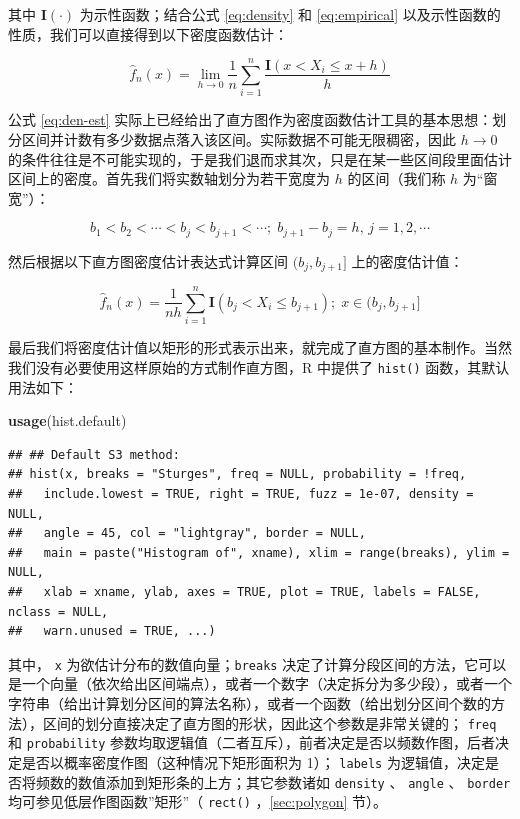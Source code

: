 \documentclass[
  b5paper,
  UTF8,twoside]{book}
\newenvironment{Shaded}{\begin{snugshade}}{\end{snugshade}}
\newcommand{\FunctionTok}[1]{\textcolor[rgb]{0.13,0.29,0.53}{\textbf{#1}}}
\newcommand{\NormalTok}[1]{#1}
\begin{document}
其中 \(\mathbf{I}(\cdot)\) 为示性函数；结合公式 \eqref{eq:density} 和 \eqref{eq:empirical} 以及示性函数的性质，我们可以直接得到以下密度函数估计：

\begin{equation} 
\hat{f}_{n}(x)=\lim_{h\rightarrow0}\frac{1}{n}\sum_{i=1}^{n}\frac{\mathbf{I}(x<X_{i}\leq x+h)}{h}
\label{eq:den-est}
\end{equation}

公式 \eqref{eq:den-est} 实际上已经给出了直方图作为密度函数估计工具的基本思想：划分区间并计数有多少数据点落入该区间。实际数据不可能无限稠密，因此 \(h\rightarrow0\) 的条件往往是不可能实现的，于是我们退而求其次，只是在某一些区间段里面估计区间上的密度。首先我们将实数轴划分为若干宽度为 \(h\) 的区间（我们称 \(h\) 为``窗宽''）：

\begin{equation} 
b_{1}<b_{2}<\cdots<b_{j}<b_{j+1}<\cdots;\;b_{j+1}-b_{j}=h,\,j=1,2,\cdots
\label{eq:den-est2}
\end{equation}

然后根据以下直方图密度估计表达式计算区间 \((b_j,b_{j+1}]\) 上的密度估计值：

\begin{equation} 
\hat{f}_{n}(x)=\frac{1}{nh}\sum_{i=1}^{n}\mathbf{I}(b_{j}<X_{i}\leq b_{j+1});\;x\in(b_{j},b_{j+1}]
\label{eq:den-formula}
\end{equation}

最后我们将密度估计值以矩形的形式表示出来，就完成了直方图的基本制作。当然我们没有必要使用这样原始的方式制作直方图，R 中提供了 \texttt{hist()} 函数，其默认用法如下：

\begin{Shaded}
\begin{Highlighting}[]
\FunctionTok{usage}\NormalTok{(hist.default)}
\end{Highlighting}
\end{Shaded}

\begin{verbatim}
## ## Default S3 method:
## hist(x, breaks = "Sturges", freq = NULL, probability = !freq,
##   include.lowest = TRUE, right = TRUE, fuzz = 1e-07, density = NULL,
##   angle = 45, col = "lightgray", border = NULL,
##   main = paste("Histogram of", xname), xlim = range(breaks), ylim = NULL,
##   xlab = xname, ylab, axes = TRUE, plot = TRUE, labels = FALSE, nclass = NULL,
##   warn.unused = TRUE, ...)
\end{verbatim}

其中， \texttt{x} 为欲估计分布的数值向量；\texttt{breaks} 决定了计算分段区间的方法，它可以是一个向量（依次给出区间端点），或者一个数字（决定拆分为多少段），或者一个字符串（给出计算划分区间的算法名称），或者一个函数（给出划分区间个数的方法），区间的划分直接决定了直方图的形状，因此这个参数是非常关键的； \texttt{freq} 和 \texttt{probability} 参数均取逻辑值（二者互斥），前者决定是否以频数作图，后者决定是否以概率密度作图（这种情况下矩形面积为 1）； \texttt{labels} 为逻辑值，决定是否将频数的数值添加到矩形条的上方；其它参数诸如 \texttt{density} 、 \texttt{angle} 、 \texttt{border} 均可参见低层作图函数''矩形''（ \texttt{rect()} ，\ref{sec:polygon} 节）。
\end{document}
